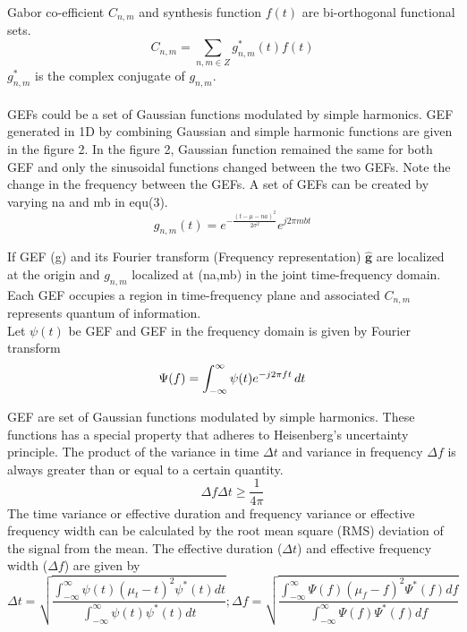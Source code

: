 \documentclass[paper=a4, fontsize=11pt,twoside]{scrartcl}		%
\begin{document}
Gabor co-efficient $C_{n,m}$ and synthesis function $f(t)$ are bi-orthogonal functional sets.  \\
\begin{equation}
C_{n,m} = \sum_{n,m\in Z} g_{n,m}^*(t) f(t)
\end{equation}
$g_{n,m}^*$ is the complex conjugate of $g_{n,m}$.\\
\\
GEFs could be a set of Gaussian functions modulated by simple harmonics. GEF generated in 1D by combining Gaussian and simple harmonic functions are given in the figure 2. In the figure 2, Gaussian function remained the same for both GEF and only the sinusoidal functions changed between the two GEFs. Note the change in the frequency between the GEFs. A set of GEFs can be created by varying na and mb in equ(3).\\
\begin{equation*}
g_{n,m}(t) =  e^{-\frac{(t-\mu-na)^2}{2\sigma^2}} e^{j2\pi mbt}
\end{equation*}

If GEF (g) and its Fourier transform (Frequency representation) $\hat{\mathbf{g}}$ are localized at the origin and $g_{n,m}$ localized at (na,mb) in the joint time-frequency domain. Each GEF occupies a region in time-frequency plane and associated $C_{n,m}$ represents quantum of information.\\

Let $\psi(t)$ be GEF and GEF in the frequency domain is given by Fourier transform \\
\begin{equation*}
\Psi(f) = \int_{-\infty}^{\infty}\psi(t) e^{-j2\pi ft}\, dt \\
\end{equation*}


GEF are set of Gaussian functions modulated by simple harmonics. These functions has a special property that adheres to Heisenberg's uncertainty principle. The product of the variance in time $\Delta t$ and variance in frequency $\Delta f$ is always greater than or equal to a certain quantity.
\begin{equation}
\Delta f \Delta t \geq \frac{1}{4\pi}
\end{equation}
The time variance or effective duration and frequency variance or effective frequency width can be calculated by the root mean square (RMS) deviation of the signal from the mean. The effective duration ($\Delta t$) and effective frequency width ($\Delta f$) are given by
\begin{equation*}
\Delta t = \sqrt{\frac{\int_{-\infty}^{\infty}{\psi(t)(\mu_t - t)^2\psi ^*(t)dt}}{\int_{-\infty}^{\infty}{\psi(t)\psi ^*(t)dt}}} ;
\Delta f = \sqrt{\frac{\int_{-\infty}^{\infty}{\Psi(f)(\mu_f - f)^2\Psi ^*(f)df}}{\int_{-\infty}^{\infty}{\Psi(f)\Psi ^*(f)df}}}
\end{equation*}
\end{document}
